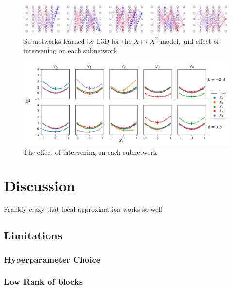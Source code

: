 \documentclass{article}
\theoremstyle{plain}
\theoremstyle{definition}
\theoremstyle{remark}
\begin{document}
\begin{figure}[htbp]
    \centerline{\includegraphics[width=\textwidth]{../figures/8_squared_subnetworks.pdf}}
    \centering
    \caption{Subnetworks learned by L3D for the $X \mapsto X^2$ model, and effect of intervening on each subnetwork}\label{fig:8_squared_subnetworks}
\end{figure}


\begin{figure}[htbp]
    \centerline{\includegraphics[width=\textwidth]{../figures/9_squared_intervention.pdf}}
    \centering
    \caption{The effect of intervening on each subnetwork}\label{fig:9_squared_intervention}
\end{figure}


\section{Discussion}

Frankly crazy that local approximation works so well 

\subsection{Limitations}

\subsubsection{Hyperparameter Choice}

\subsubsection{Low Rank of blocks}
\end{document}
